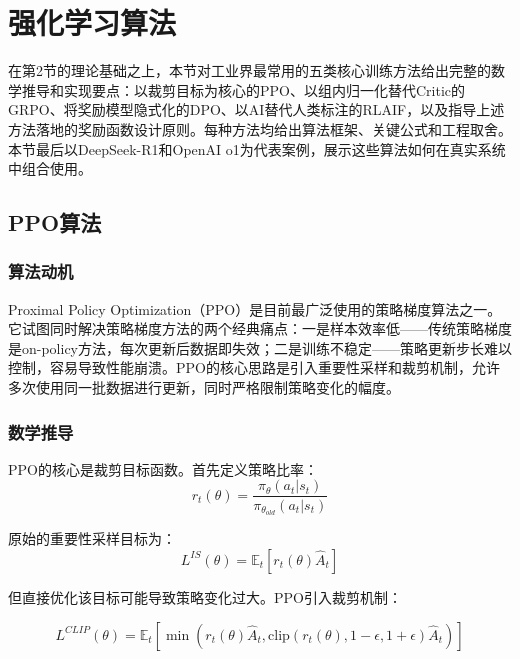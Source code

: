 \documentclass[12pt,a4paper]{article}
\begin{document}
\section{强化学习算法}

在第2节的理论基础之上，本节对工业界最常用的五类核心训练方法给出完整的数学推导和实现要点：以裁剪目标为核心的PPO、以组内归一化替代Critic的GRPO、将奖励模型隐式化的DPO、以AI替代人类标注的RLAIF，以及指导上述方法落地的奖励函数设计原则。每种方法均给出算法框架、关键公式和工程取舍。本节最后以DeepSeek-R1和OpenAI o1为代表案例，展示这些算法如何在真实系统中组合使用。

\subsection{PPO算法}

\subsubsection{算法动机}

Proximal Policy Optimization（PPO）是目前最广泛使用的策略梯度算法之一。它试图同时解决策略梯度方法的两个经典痛点：一是样本效率低——传统策略梯度是on-policy方法，每次更新后数据即失效；二是训练不稳定——策略更新步长难以控制，容易导致性能崩溃。PPO的核心思路是引入重要性采样和裁剪机制，允许多次使用同一批数据进行更新，同时严格限制策略变化的幅度。

\subsubsection{数学推导}

PPO的核心是裁剪目标函数。首先定义策略比率：
\begin{equation}
r_t(\theta) = \frac{\pi_\theta(a_t|s_t)}{\pi_{\theta_{old}}(a_t|s_t)}
\end{equation}

原始的重要性采样目标为：
\begin{equation}
L^{IS}(\theta) = \mathbb{E}_t\left[r_t(\theta) \hat{A}_t\right]
\end{equation}

但直接优化该目标可能导致策略变化过大。PPO引入裁剪机制：

\begin{equation}
L^{CLIP}(\theta) = \mathbb{E}_t\left[\min\left(r_t(\theta)\hat{A}_t, \text{clip}(r_t(\theta), 1-\epsilon, 1+\epsilon)\hat{A}_t\right)\right]
\end{equation}
\end{document}
